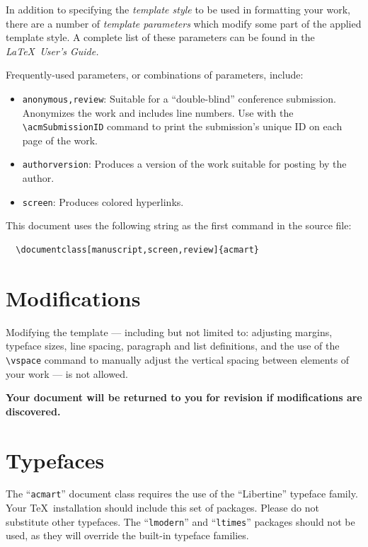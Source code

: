 \documentclass[manuscript,screen]{acmart}
\providecommand{\tightlist}{%
  \setlength{\itemsep}{0pt}\setlength{\parskip}{0pt}}\usepackage{longtable,booktabs,array}
\begin{document}
In addition to specifying the \emph{template style} to be used in
formatting your work, there are a number of \emph{template parameters}
which modify some part of the applied template style. A complete list of
these parameters can be found in the \emph{\LaTeX~User's Guide.}

Frequently-used parameters, or combinations of parameters, include:

\begin{itemize}
\tightlist
\item
  \texttt{anonymous,review}: Suitable for a ``double-blind'' conference
  submission. Anonymizes the work and includes line numbers. Use with
  the \texttt{\textbackslash{}acmSubmissionID} command to print the
  submission's unique ID on each page of the work.
\item
  \texttt{authorversion}: Produces a version of the work suitable for
  posting by the author.
\item
  \texttt{screen}: Produces colored hyperlinks.
\end{itemize}

This document uses the following string as the first command in the
source file:

\begin{verbatim}
  \documentclass[manuscript,screen,review]{acmart}
\end{verbatim}

\hypertarget{modifications}{%
\section{Modifications}\label{modifications}}

Modifying the template --- including but not limited to: adjusting
margins, typeface sizes, line spacing, paragraph and list definitions,
and the use of the \texttt{\textbackslash{}vspace} command to manually
adjust the vertical spacing between elements of your work --- is not
allowed.

\textbf{Your document will be returned to you for revision if
modifications are discovered.}

\hypertarget{typefaces}{%
\section{Typefaces}\label{typefaces}}

The ``\texttt{acmart}'' document class requires the use of the
``Libertine'' typeface family. Your \TeX~installation should include
this set of packages. Please do not substitute other typefaces. The
``\texttt{lmodern}'' and ``\texttt{ltimes}'' packages should not be
used, as they will override the built-in typeface families.
\end{document}
